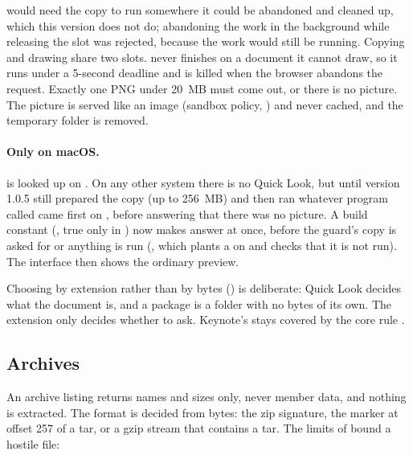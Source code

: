 \begin{enumerate}
        would need the copy to run somewhere it could be abandoned and cleaned up, which this
        version does not do; abandoning the work in the background while releasing the slot
        was rejected, because the work would still be running.  Copying and
        drawing share two slots.   never finishes on a document it cannot
        draw, so it runs under a 5-second deadline and is killed when the browser abandons
        the request.  Exactly one PNG under 20~MB must come out, or there is no picture.
        The picture is served like an image (sandbox policy, ) and never
        cached, and the temporary folder is removed.
\end{enumerate}

\paragraph{Only on macOS.}   is looked up on .  On any other
system there is no Quick Look, but until version 1.0.5  still prepared
the copy (up to 256~MB) and then ran whatever program called  came first
on , before answering that there was no picture.  A build constant
(, true only in ) now makes 
answer  at once, before the guard's copy is asked for or anything
is run (, which plants a  on 
and checks that it is not run).  The interface then shows the ordinary preview.

Choosing by extension rather than by bytes () is deliberate: Quick Look decides
what the document is, and a package is a folder with no bytes of its own.  The extension only
decides whether to ask.  Keynote's  stays covered by the core rule .

\subsection{Archives}

An archive listing returns names and sizes only, never member data, and nothing is extracted.
The format is decided from bytes: the zip signature, the  marker at offset 257 of a
tar, or a gzip stream that contains a tar.  The limits of  bound a hostile file:

